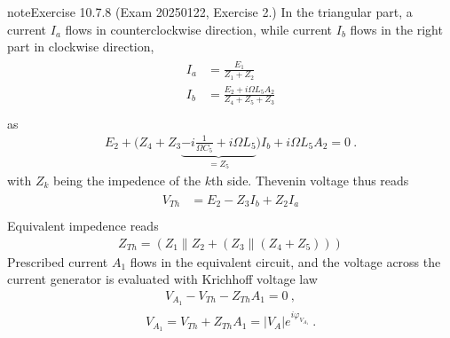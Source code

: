\documentclass[letterpaper,10pt,italian]{jupyterBook}
\begin{document}
\begin{sphinxadmonition}{note}{Exercise 10.7.8 (Exam 2025\sphinxhyphen{}01\sphinxhyphen{}22, Exercise 2.)}
\sphinxAtStartPar
In the triangular part, a current \(I_{a}\) flows in counter\sphinxhyphen{}clockwise direction, while current \(I_b\) flows in the right part in clockwise direction,
\begin{equation*}
\begin{split}\begin{aligned}
  I_a & = \frac{E_1}{Z_1 + Z_2} \\
  I_b & = \frac{E_2 + i \Omega L_5 A_2}{Z_4 + Z_5 + Z_3} \\
\end{aligned}\end{split}
\end{equation*}
\sphinxAtStartPar
as
\begin{equation*}
\begin{split}E_2 + \bigg( Z_4 + Z_3 \underbrace{- i \frac{1}{\Omega C_5} + i \Omega L_5}_{=Z_5} \bigg) I_b + i \Omega L_5 A_2 = 0 \ . \end{split}
\end{equation*}
\sphinxAtStartPar
with \(Z_k\) being the impedence of the \(k\)\sphinxhyphen{}th side. Thevenin voltage thus reads
\begin{equation*}
\begin{split}\begin{aligned}
  V_{Th} & = E_2 - Z_3 I_b + Z_2 I_a \\ 
\end{aligned}\end{split}
\end{equation*}
\sphinxAtStartPar
{} Equivalent impedence reads
\begin{equation*}
\begin{split}Z_{Th} = (Z_1 \parallel Z_2 + ( Z_3 \parallel (Z_4 + Z_5)))\end{split}
\end{equation*}
\sphinxAtStartPar
{} Prescribed current \(A_1\) flows in the equivalent circuit, and the voltage across the current generator is evaluated with Krichhoff voltage law
\begin{equation*}
\begin{split}V_{A_1} - V_{Th} - Z_{Th} A_1 = 0 \ ,\end{split}
\end{equation*}\begin{equation*}
\begin{split}V_{A_1} = V_{Th} + Z_{Th} A_1 = |V_A| e^{i \varphi_{V_{A_1}}} \ .\end{split}

\end{equation*}
\end{sphinxadmonition}
\end{document}
